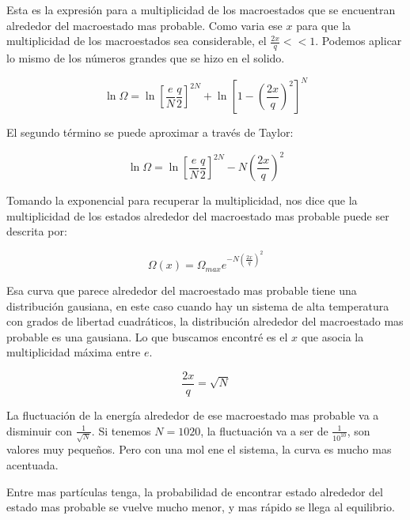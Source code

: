 \documentclass[11pt,fleqn]{book}
\begin{document}
Esta es la expresión para a multiplicidad de los macroestados que se encuentran alrededor del macroestado mas probable. Como varia ese $x$ para que la multiplicidad de los macroestados sea considerable, el $\frac{2x}{q}<<1$. Podemos aplicar lo mismo de los números grandes que se hizo en el solido.

\begin{equation*}
    \ln \Omega=\ln \left[\frac{e}{N} \frac{q}{2}\right]^{2 N}+\ln \left[1-\left(\frac{2 x}{q}\right)^{2}\right]^{N}
\end{equation*}

El segundo término se puede aproximar a través de Taylor:

\begin{equation}
\ln \Omega=\ln \left[\frac{e}{N} \frac{q}{2}\right]^{2 N}-N\left(\frac{2 x}{q}\right)^{2}
\end{equation}

Tomando la exponencial para recuperar la multiplicidad, nos dice que la multiplicidad de los estados alrededor del macroestado mas probable puede ser descrita por:

\begin{equation}
    \Omega(x)=\Omega_{max} e^{-N\left(\frac{2 x}{q}\right)^{2}}
\label{Eq. 3.11}
\end{equation}

Esa curva que parece alrededor del macroestado mas probable tiene una distribución gausiana, en este caso cuando hay un sistema de alta temperatura con grados de libertad cuadráticos, la distribución alrededor del macroestado mas probable es una gausiana. Lo que buscamos encontré es el $x$ que asocia la multiplicidad máxima entre $e$.

\begin{equation*}
    \frac{2x}{q}=\sqrt{N}
\end{equation*}

La fluctuación de la energía alrededor de ese macroestado mas probable va a disminuir con $\frac{1}{\sqrt{N}}$.  Si tenemos $N=10{20}$, la fluctuación va a ser de $\frac{1}{10^{10}}$, son valores muy pequeños. Pero con una mol ene el sistema, la curva es mucho mas acentuada.


Entre mas partículas tenga, la probabilidad de encontrar estado alrededor del estado mas probable se vuelve mucho menor, y mas rápido se llega al equilibrio. 
\end{document}
